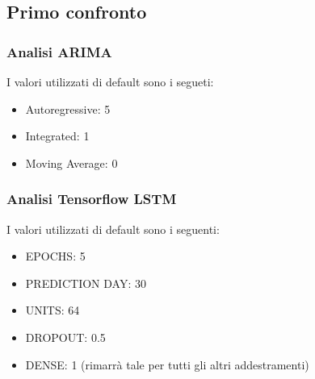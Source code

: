 \documentclass[a4paper,12pt]{article}
\begin{document}
        \subsection{Primo confronto}
            \subsubsection{Analisi ARIMA} I valori utilizzati di default sono i
            segueti:
            \begin{itemize}
                \item Autoregressive: 5
                \item Integrated: 1
                \item Moving Average: 0 
            \end{itemize}
            \subsubsection{Analisi Tensorflow LSTM} I valori utilizzati di 
            default sono i seguenti:
            \begin{itemize}
                \item EPOCHS: 5
                \item PREDICTION DAY: 30
                \item UNITS: 64
                \item DROPOUT: 0.5
                \item DENSE: 1 (rimarrà tale per tutti gli altri addestramenti)
            \end{itemize}
\end{document}
